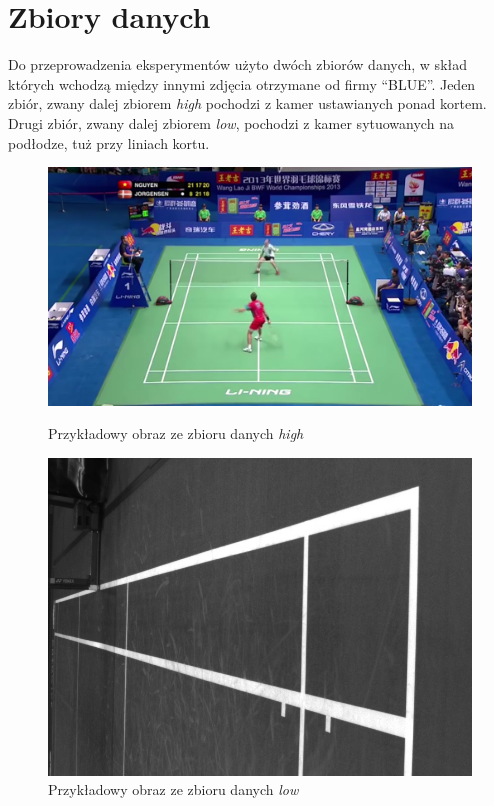 \newpage
\section{Zbiory danych}

Do przeprowadzenia eksperymentów użyto dwóch zbiorów danych, w skład których wchodzą między innymi zdjęcia otrzymane od firmy ``BLUE''.
Jeden zbiór, zwany dalej zbiorem \textit{high} pochodzi z kamer ustawianych ponad kortem.
Drugi zbiór, zwany dalej zbiorem \textit{low}, pochodzi z kamer sytuowanych na podłodze, tuż przy liniach kortu.


\begin{figure}[!htb]
    \includegraphics[width=\linewidth]{../badminton/datasets/high/split/test_court2-00002.png}
    \caption{Przykładowy obraz ze zbioru danych \textit{high}}
  \endminipage\hfill
    \includegraphics[width=\linewidth]{../badminton/datasets/low/split/1564909032792410075.jpg}
    \caption{Przykładowy obraz ze zbioru danych \textit{low}}
  \endminipage\hfill
\end{figure}

